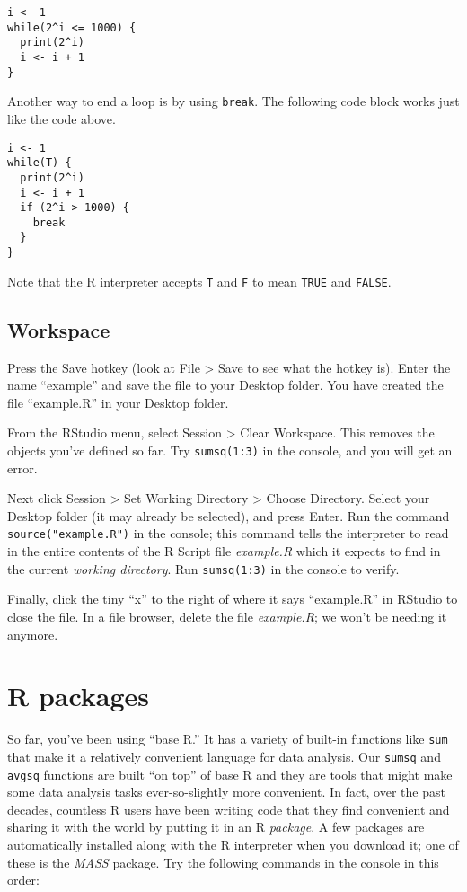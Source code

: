 \documentclass[]{book}
\theoremstyle{definition}
\theoremstyle{definition}
\theoremstyle{definition}
\theoremstyle{remark}
\begin{document}
\begin{verbatim}
i <- 1
while(2^i <= 1000) {
  print(2^i)
  i <- i + 1
}
\end{verbatim}

Another way to end a loop is by using \texttt{break}. The following code
block works just like the code above.

\begin{verbatim}
i <- 1
while(T) {
  print(2^i)
  i <- i + 1
  if (2^i > 1000) {
    break
  }
}
\end{verbatim}

Note that the R interpreter accepts \texttt{T} and \texttt{F} to mean
\texttt{TRUE} and \texttt{FALSE}.

\hypertarget{workspace}{%
\subsection{Workspace}\label{workspace}}

Press the Save hotkey (look at File \textgreater{} Save to see what the
hotkey is). Enter the name ``example'' and save the file to your Desktop
folder. You have created the file ``example.R'' in your Desktop folder.

From the RStudio menu, select Session \textgreater{} Clear Workspace.
This removes the objects you've defined so far. Try \texttt{sumsq(1:3)}
in the console, and you will get an error.

Next click Session \textgreater{} Set Working Directory \textgreater{}
Choose Directory. Select your Desktop folder (it may already be
selected), and press Enter. Run the command \texttt{source("example.R")}
in the console; this command tells the interpreter to read in the entire
contents of the R Script file \emph{example.R} which it expects to find
in the current \emph{working directory}. Run \texttt{sumsq(1:3)} in the
console to verify.

Finally, click the tiny ``x'' to the right of where it says
``example.R'' in RStudio to close the file. In a file browser, delete
the file \emph{example.R}; we won't be needing it anymore.

\hypertarget{r-packages}{%
\section{R packages}\label{r-packages}}

So far, you've been using ``base R.'' It has a variety of built-in
functions like \texttt{sum} that make it a relatively convenient
language for data analysis. Our \texttt{sumsq} and \texttt{avgsq}
functions are built ``on top'' of base R and they are tools that might
make some data analysis tasks ever-so-slightly more convenient. In fact,
over the past decades, countless R users have been writing code that
they find convenient and sharing it with the world by putting it in an R
\emph{package}. A few packages are automatically installed along with
the R interpreter when you download it; one of these is the \emph{MASS}
package. Try the following commands in the console in this order:
\end{document}
